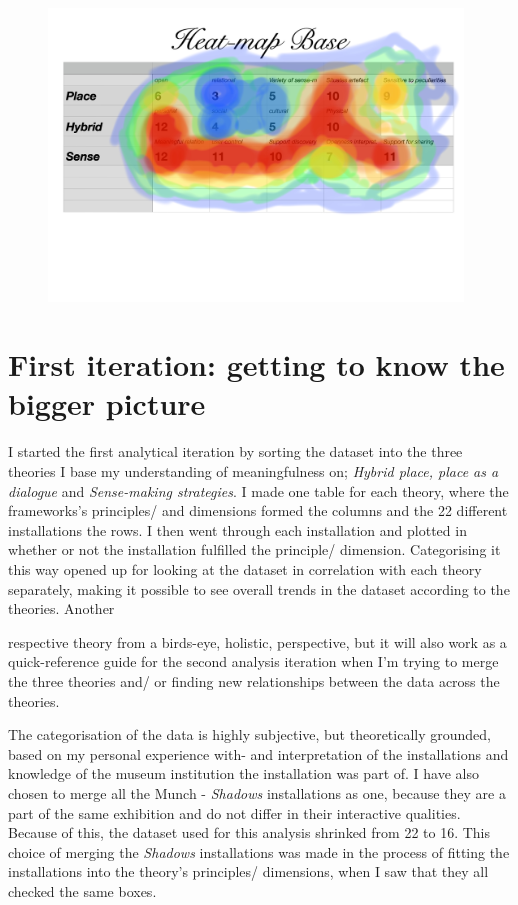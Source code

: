 \begin{figure}[H]
\includegraphics[width=11cm]{pictures/dataset/heatmap.jpg}
\centering 
\end{figure}


\section{First iteration: getting to know the bigger picture}

I started the first analytical iteration by sorting the dataset into the three theories I base my understanding of meaningfulness on; \emph{Hybrid place, place as a dialogue} and \emph{Sense-making strategies}. I made one table for each theory, where the frameworks's principles/ and dimensions formed the columns and the 22 different installations the rows. I then went through each installation and plotted in whether or not the installation fulfilled the principle/ dimension. Categorising it this way opened up for looking at the dataset in correlation with each theory separately, making it possible to see overall trends in the dataset according to the theories. Another


respective theory from a birds-eye, holistic, perspective, but it will also work as a quick-reference guide for the second analysis iteration when I'm trying to merge the three theories and/ or finding new relationships between the data across the theories.

The categorisation of the data is highly subjective, but theoretically grounded, based on my personal experience with- and interpretation of the installations and knowledge of the museum institution the installation was part of. I have also chosen to merge all the Munch - \emph{Shadows} installations as one, because they are a part of the same exhibition and do not differ in their interactive qualities. Because of this, the dataset used for this analysis shrinked from 22 to 16. This choice of merging the \emph{Shadows} installations was made in the process of fitting the installations into the theory's principles/ dimensions, when I saw that they all checked the same boxes. 


